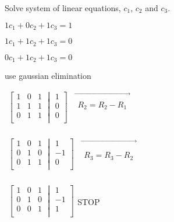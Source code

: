 \documentclass{extarticle}
\begin{document}
\begin{multicols}{4}
Solve system of linear equations, $c_1$, $c_2$ and $c_3$.

$1c_1+0c_2+1c_3=1$

$1c_1+1c_2+1c_3=0$

$0c_1+1c_2+1c_3=0$

use gaussian elimination


$\begin{matrix}\left[\begin{matrix}1&0&1\\1&1&1\\0&1&1\\\end{matrix}\middle|\begin{matrix}1\\0\\0\\\end{matrix}\right]&\vec{\begin{matrix}\\R_2=R_2-R_1\\ \\\end{matrix}}\\\end{matrix}$

$\begin{matrix}\left[\begin{matrix}1&0&1\\0&1&0\\0&1&1\\\end{matrix}\middle|\begin{matrix}1\\-1\\0\\\end{matrix}\right]&\vec{\begin{matrix}\\ \\R_3=R_3-R_2\\\end{matrix}}\\\end{matrix}$

$\begin{matrix}\left[\begin{matrix}1&0&1\\0&1&0\\0&0&1\\\end{matrix}\middle|\begin{matrix}1\\-1\\1\\\end{matrix}\right]\\\end{matrix}$STOP


\end{multicols}
\end{document}
